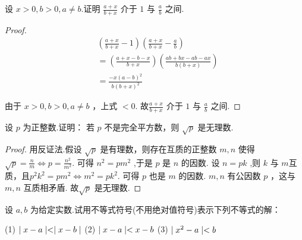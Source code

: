 \begin{practice}
    设 $x>0,b>0,a\ne b$.证明 $\frac{a+x}{b+x}$ 介于 $1$ 与 $\frac{a}{b}$ 之间.
\end{practice}

\begin{proof}
\begin{align*}
    &(\frac{a+x}{b+x}-1)(\frac{a+x}{b+x}-\frac{a}{b}) \\
    &= (\frac{a+x-b-x}{b+x})(\frac{ab+bx-ab-ax}{b(b+x)}) \\
    & =\frac{-x(a-b)^2}{b(b+x)^2}
\end{align*}

由于 $x>0,b>0,a\ne b$ ，上式 $<0$. 故$\frac{a+x}{b+x}$ 介于 $1$ 与 $\frac{a}{b}$ 之间.
\end{proof}

\begin{practice}
    设 $p$ 为正整数.证明： 若 $p$ 不是完全平方数，则 $\sqrt{p}$ 是无理数.
\end{practice}

\begin{proof}
    用反证法.假设 $\sqrt{p}$ 是有理数，则存在互质的正整数 $m,n$ 使得 $\sqrt{p} = \frac{n}{m} \iff p=\frac{n^2}{m^2}$. 可得 $n^2 = p m^2$ ,于是 $p$ 是 $n$ 的因数. 设 $n=pk$ ,则 $k$ 与 $m$互质，且$p^2k^2 = pm^2 \iff m^2 = pk^2$. 可得 $p$ 也是 $m$ 的因数. $m,n$ 有公因数 $p$ ，这与 $m,n$ 互质相矛盾. 故$\sqrt{p}$ 是无理数.
\end{proof}

\begin{practice}
    设 $a,b$ 为给定实数.试用不等式符号(不用绝对值符号)表示下列不等式的解：

    (1) $\mid x-a \mid < \mid x-b \mid$ \quad (2) $\mid x-a \mid < x-b$ \quad (3) $\mid x^2-a \mid<b$
\end{practice}


